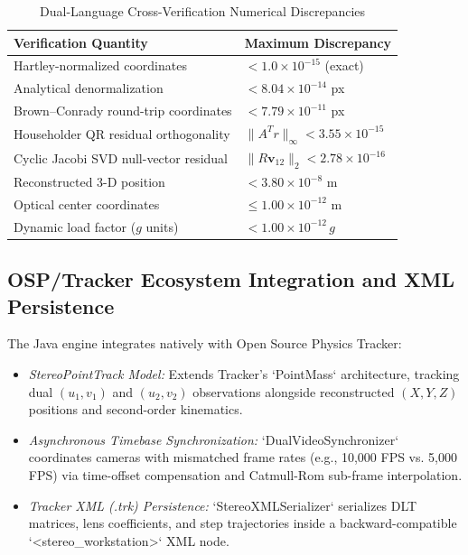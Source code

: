 \documentclass[a4paper,conference]{IEEEtran}
\begin{document}
\begin{table}[t]
\caption{Dual-Language Cross-Verification Numerical Discrepancies}
\label{tab:parity}
\centering
\footnotesize
\begin{tabular}{P{0.52\columnwidth}P{0.38\columnwidth}}
\toprule
Verification Quantity & Maximum Discrepancy \\
\midrule
Hartley-normalized coordinates & $< 1.0 \times 10^{-15}$ (exact) \\
Analytical denormalization & $< 8.04 \times 10^{-14}$ px \\
Brown--Conrady round-trip coordinates & $< 7.79 \times 10^{-11}$ px \\
Householder QR residual orthogonality & $\|A^T r\|_\infty < 3.55 \times 10^{-15}$ \\
Cyclic Jacobi SVD null-vector residual & $\|R \mathbf{v}_{12}\|_2 < 2.78 \times 10^{-16}$ \\
Reconstructed 3-D position & $< 3.80 \times 10^{-8}$ m \\
Optical center coordinates & $\le 1.00 \times 10^{-12}$ m \\
Dynamic load factor ($g$ units) & $< 1.00 \times 10^{-12}\,g$ \\
\bottomrule
\end{tabular}
\end{table}

\subsection{OSP/Tracker Ecosystem Integration and XML Persistence}
The Java engine integrates natively with Open Source Physics Tracker:
\begin{itemize}
  \item \textit{StereoPointTrack Model:} Extends Tracker's `PointMass` architecture, tracking dual $(u_1, v_1)$ and $(u_2, v_2)$ observations alongside reconstructed $(X, Y, Z)$ positions and second-order kinematics.
  \item \textit{Asynchronous Timebase Synchronization:} `DualVideoSynchronizer` coordinates cameras with mismatched frame rates (e.g., 10,000 FPS vs. 5,000 FPS) via time-offset compensation and Catmull-Rom sub-frame interpolation.
  \item \textit{Tracker XML (.trk) Persistence:} `StereoXMLSerializer` serializes DLT matrices, lens coefficients, and step trajectories inside a backward-compatible `<stereo_workstation>` XML node.
\end{itemize}
\end{document}
